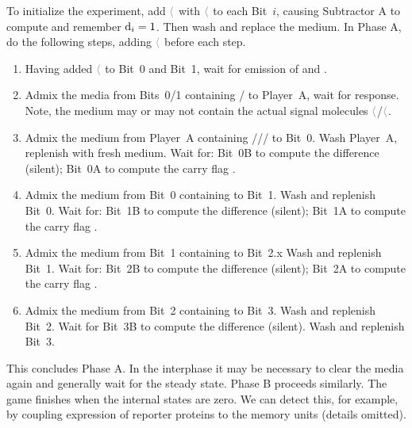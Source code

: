 \documentclass[12pt,notitlepage]{article}
\newcommand{\cbra}[1]{{\ensuremath{\color{gray}{#1}}}}
\newcommand{\signal}[1]{{{\cbra{\langle}\ce{#1}\cbra{\rangle}}}}
\begin{document}
To initialize the experiment,
add 
\signal{w_B} with \signal{s_i}
to each Bit~$i$,
causing Subtractor A to compute and remember $\ce{d_i} = 1$.
%
Then wash and replace the medium.
%
%
%
In Phase A,
do the following steps,
adding \signal{w_A} before each step.
%
\begin{enumerate}
\item
    Having added \signal{w_A} to Bit~0 and Bit~1,
    wait for emission of  and .
    
\item
    Admix the media from Bits~0/1
    containing / to Player~A,
    wait for response.
    Note, the medium may or may not contain
    the actual signal molecules \signal{s_0}/\signal{s_1}.
    
\item
    Admix the medium from Player~A 
    containing ///
    to Bit~0.
    Wash Player~A, replenish with fresh medium.
    Wait for:
    Bit~0B to compute the difference  (silent);
    Bit~0A to compute the carry flag . 
    
\item
    Admix the medium from Bit~0 containing  to Bit~1.
    Wash and replenish Bit~0.
    Wait for:
    Bit~1B to compute the difference  (silent);
    Bit~1A to compute the carry flag . 
    
\item
    Admix the medium from Bit~1 containing 
    to Bit~2.x
    Wash and replenish Bit~1.
    Wait for:
    Bit~2B to compute the difference  (silent);
    Bit~2A to compute the carry flag . 
    
\item
    Admix the medium from Bit~2 containing 
    to Bit~3.
    Wash and replenish Bit~2.
    Wait for
    Bit~3B to compute the difference  (silent).
    Wash and replenish Bit~3.
\end{enumerate}

%

This concludes Phase A.
%
In the interphase it may be necessary
to clear the media again
and generally wait for the steady state.
%
Phase B proceeds similarly.
%
The game finishes when 
the internal states  are zero.
%
We can detect this,
for example,
by coupling expression of reporter proteins
to the memory units
(details omitted).
\end{document}
